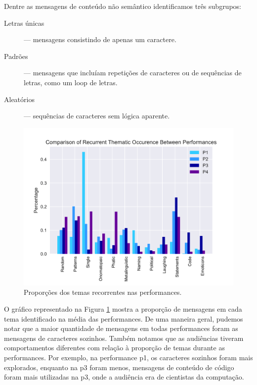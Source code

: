 Dentre as mensagens de conteúdo não semântico identificamos três subgrupos:

\begin{description}
\item[Letras únicas] --- mensagens consistindo de apenas um caractere.
\item[Padrões] --- mensagens que incluíam repetições de caracteres ou de sequências de letras, como um loop de letras.
\item[Aleatórios] --- sequências de caracteres sem lógica aparente.
\end{description}

\begin{figure}
\includegraphics[width=1\linewidth]{pictures/cap3/bar_plot_new_revised}
\caption{Proporções dos temas recorrentes nas performances.}
\label{donut}
\end{figure}

O gráfico representado na Figura \ref{donut} mostra a proporção de mensagens em cada tema identificado na média das performances. De uma maneira geral, pudemos notar que a maior quantidade de mensagens em todas performances foram as mensagens de caracteres sozinhos. Também notamos que as audiências tiveram comportamentos diferentes com relação à proporção de temas durante as performances. Por exemplo, na performance p1, os caracteres sozinhos foram mais explorados, enquanto na p3 foram menos, mensagens de conteúdo de código foram mais utilizadas na p3, onde a audiência era de cientistas da computação.

